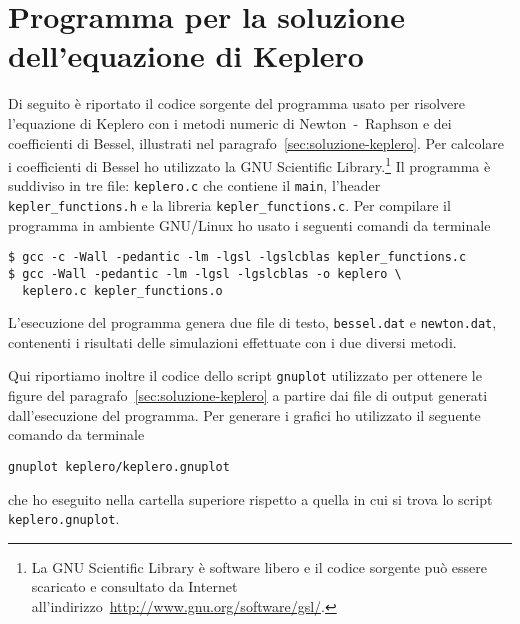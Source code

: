 \chapter{Programma per la soluzione dell'equazione di Keplero}
\label{cha:soluzione-keplero}

Di seguito è riportato il codice sorgente del programma usato per risolvere
l'equazione di Keplero con i metodi numeric di Newton~-~Raphson e dei
coefficienti di Bessel, illustrati nel
paragrafo~\ref{sec:soluzione-keplero}. Per calcolare i coefficienti di Bessel ho
utilizzato la GNU Scientific
Library.\footnote{La GNU Scientific Library è software libero e il codice
  sorgente può essere scaricato e consultato da Internet
  all'indirizzo~\url{http://www.gnu.org/software/gsl/}.}
Il programma è suddiviso in tre file: \verb|keplero.c| che contiene il
\verb|main|, l'header \verb|kepler_functions.h| e la libreria
\verb|kepler_functions.c|. Per compilare il programma in ambiente GNU/Linux ho
usato i seguenti comandi da terminale
\begin{verbatim}
$ gcc -c -Wall -pedantic -lm -lgsl -lgslcblas kepler_functions.c
$ gcc -Wall -pedantic -lm -lgsl -lgslcblas -o keplero \
  keplero.c kepler_functions.o
\end{verbatim}
L'esecuzione del programma genera due file di testo, \verb|bessel.dat| e
\verb|newton.dat|, contenenti i risultati delle simulazioni effettuate con i due
diversi metodi.
% 

Qui riportiamo inoltre il codice dello script \verb|gnuplot| utilizzato per
ottenere le figure del paragrafo~\ref{sec:soluzione-keplero} a partire dai file
di output generati dall'esecuzione del programma. Per generare i grafici ho
utilizzato il seguente comando da terminale
\begin{verbatim}
gnuplot keplero/keplero.gnuplot
\end{verbatim}
che ho eseguito nella cartella superiore rispetto a quella in cui si trova lo
script \verb|keplero.gnuplot|.


